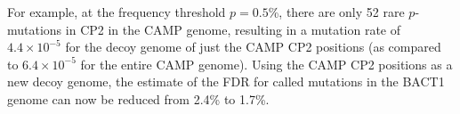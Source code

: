 For example, at the frequency threshold $p=0.5$\%, there are only 52 rare $p$-mutations in CP2 in the CAMP genome, resulting in a mutation rate of $4.4 \times 10^{-5}$ for the decoy genome of just the CAMP CP2 positions (as compared to $6.4 \times 10^{-5}$ for the entire CAMP genome). Using the CAMP CP2 positions as a new decoy genome, the estimate of the FDR for called mutations in the BACT1 genome can now be reduced from 2.4\% to 1.7\%.\endinput